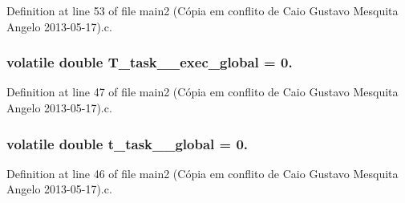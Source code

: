 Definition at line 53 of file main2 (\-Cópia em conflito de Caio Gustavo Mesquita Angelo 2013-\/05-\/17).\-c.

\hypertarget{main2_01_07C_xC3_xB3pia_01em_01conflito_01de_01Caio_01Gustavo_01Mesquita_01Angelo_012013-05-17_08_8c_acdaa4a9b0e1be3dfa53b52df6410ad3b}{
\subsubsection[{T\-\_\-task\-\_\-1\-\_\-exec\-\_\-global}]{\setlength{\rightskip}{0pt plus 5cm}volatile double T\-\_\-task\-\_\-\_\-exec\-\_\-global = 0.}}\label{main2_01_07C_xC3_xB3pia_01em_01conflito_01de_01Caio_01Gustavo_01Mesquita_01Angelo_012013-05-17_08_8c_acdaa4a9b0e1be3dfa53b52df6410ad3b}


Definition at line 47 of file main2 (\-Cópia em conflito de Caio Gustavo Mesquita Angelo 2013-\/05-\/17).\-c.

\hypertarget{main2_01_07C_xC3_xB3pia_01em_01conflito_01de_01Caio_01Gustavo_01Mesquita_01Angelo_012013-05-17_08_8c_a2a2a647912528f7aa86812528dbfe02f}{
\subsubsection[{t\-\_\-task\-\_\-1\-\_\-global}]{\setlength{\rightskip}{0pt plus 5cm}volatile double t\-\_\-task\-\_\-\_\-global = 0.}}\label{main2_01_07C_xC3_xB3pia_01em_01conflito_01de_01Caio_01Gustavo_01Mesquita_01Angelo_012013-05-17_08_8c_a2a2a647912528f7aa86812528dbfe02f}


Definition at line 46 of file main2 (\-Cópia em conflito de Caio Gustavo Mesquita Angelo 2013-\/05-\/17).\-c.

